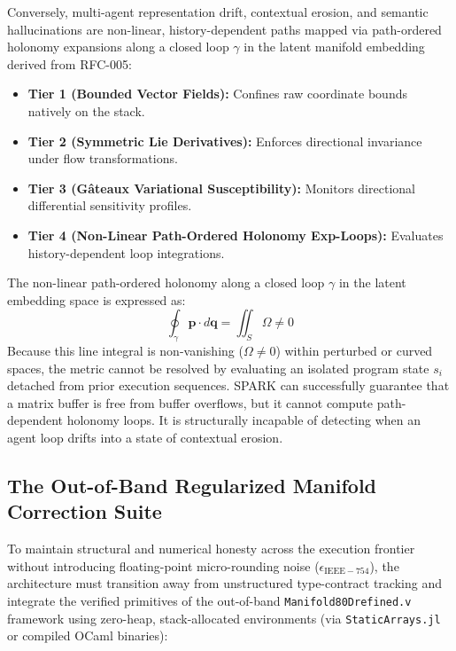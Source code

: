 Conversely, multi-agent representation drift, contextual erosion, and semantic hallucinations are non-linear, history-dependent paths mapped via path-ordered holonomy expansions along a closed loop $\gamma$ in the latent manifold embedding derived from RFC-005:
\begin{itemize}
    \item \textbf{Tier 1 (Bounded Vector Fields):} Confines raw coordinate bounds natively on the stack.
    \item \textbf{Tier 2 (Symmetric Lie Derivatives):} Enforces directional invariance under flow transformations.
    \item \textbf{Tier 3 (G\^{a}teaux Variational Susceptibility):} Monitors directional differential sensitivity profiles.
    \item \textbf{Tier 4 (Non-Linear Path-Ordered Holonomy Exp-Loops):} Evaluates history-dependent loop integrations.
\end{itemize}
The non-linear path-ordered holonomy along a closed loop $\gamma$ in the latent embedding space is expressed as:
\begin{equation}
\oint_\gamma \mathbf{p} \cdot d\mathbf{q} = \iint_S \Omega \neq 0
\end{equation}
Because this line integral is non-vanishing ($\Omega \neq 0$) within perturbed or curved spaces, the metric cannot be resolved by evaluating an isolated program state $s_i$ detached from prior execution sequences. SPARK can successfully guarantee that a matrix buffer is free from buffer overflows, but it cannot compute path-dependent holonomy loops. It is structurally incapable of detecting when an agent loop drifts into a state of contextual erosion.

\subsection{The Out-of-Band Regularized Manifold Correction Suite}
To maintain structural and numerical honesty across the execution frontier without introducing floating-point micro-rounding noise (\(\epsilon_{\mathrm{IEEE-754}}\)), the architecture must transition away from unstructured type-contract tracking and integrate the verified primitives of the out-of-band \texttt{Manifold80Drefined.v} framework using zero-heap, stack-allocated environments (via \texttt{StaticArrays.jl} or compiled OCaml binaries):


